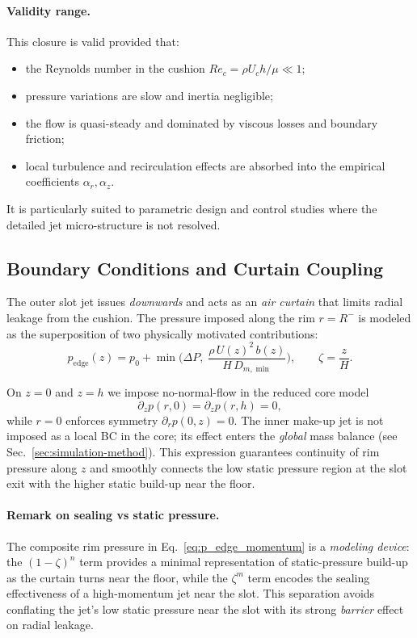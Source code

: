 \documentclass[11pt,a4paper]{article}
\begin{document}
\paragraph{Validity range.}
This closure is valid provided that:
\begin{itemize}
  \item the Reynolds number in the cushion $Re_c=\rho U_c h/\mu \ll 1$;
  \item pressure variations are slow and inertia negligible;
  \item the flow is quasi-steady and dominated by viscous losses and boundary friction;
  \item local turbulence and recirculation effects are absorbed into the empirical coefficients $\alpha_r,\alpha_z$.
\end{itemize}
It is particularly suited to parametric design and control studies where the detailed jet micro-structure is not resolved.

\subsection{Boundary Conditions and Curtain Coupling} \label{sec:boundaryconditions}
The outer slot jet issues \emph{downwards} and acts as an \emph{air curtain} that
limits radial leakage from the cushion. The pressure imposed along the rim
$r=R^{-}$ is modeled as the superposition of two physically motivated
contributions:
\begin{equation}
  p_{\mathrm{edge}}(z)=p_0 + \min\!\Big(\Delta P,\;\frac{\rho\,U(z)^2\,b(z)}{H\,D_{m,\min}}\Big),\qquad \zeta=\frac{z}{H}.
  \label{eq:p_edge_momentum}
\end{equation}

On $z=0$ and $z=h$ we impose no-normal-flow in the reduced core model
\begin{equation}
  \partial_z p(r,0)=\partial_z p(r,h)=0,
\end{equation}
while $r=0$ enforces symmetry $\partial_r p(0,z)=0$. The inner make-up jet is not
imposed as a local BC in the core; its effect enters the \emph{global} mass balance
(see Sec.~\ref{sec:simulation-method}).
This expression guarantees continuity of rim pressure along $z$ and smoothly connects
the low static pressure region at the slot exit with the higher static build-up near the
floor.

\paragraph{Remark on sealing vs static pressure.}
The composite rim pressure in Eq.~\eqref{eq:p_edge_momentum} is a
\emph{modeling device}: the $(1-\zeta)^n$ term provides a minimal representation
of static-pressure build-up as the curtain turns near the floor, while the
$\zeta^m$ term encodes the sealing effectiveness of a high-momentum jet near the slot.
This separation avoids conflating the jet's low static pressure near the slot with
its strong \emph{barrier} effect on radial leakage.
\end{document}

